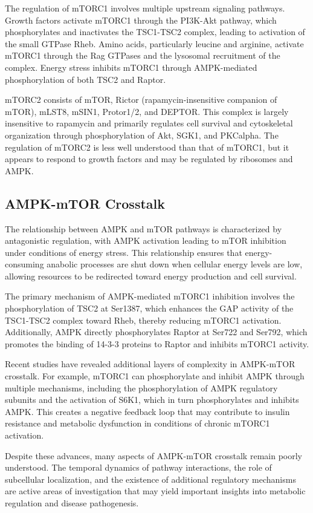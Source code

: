 \documentclass[11pt,a4paper]{article}
\begin{document}
The regulation of mTORC1 involves multiple upstream signaling pathways. Growth factors activate mTORC1 through the PI3K-Akt pathway, which phosphorylates and inactivates the TSC1-TSC2 complex, leading to activation of the small GTPase Rheb. Amino acids, particularly leucine and arginine, activate mTORC1 through the Rag GTPases and the lysosomal recruitment of the complex. Energy stress inhibits mTORC1 through AMPK-mediated phosphorylation of both TSC2 and Raptor.

mTORC2 consists of mTOR, Rictor (rapamycin-insensitive companion of mTOR), mLST8, mSIN1, Protor1/2, and DEPTOR. This complex is largely insensitive to rapamycin and primarily regulates cell survival and cytoskeletal organization through phosphorylation of Akt, SGK1, and PKCalpha. The regulation of mTORC2 is less well understood than that of mTORC1, but it appears to respond to growth factors and may be regulated by ribosomes and AMPK.

\subsection{AMPK-mTOR Crosstalk}

The relationship between AMPK and mTOR pathways is characterized by antagonistic regulation, with AMPK activation leading to mTOR inhibition under conditions of energy stress. This relationship ensures that energy-consuming anabolic processes are shut down when cellular energy levels are low, allowing resources to be redirected toward energy production and cell survival.

The primary mechanism of AMPK-mediated mTORC1 inhibition involves the phosphorylation of TSC2 at Ser1387, which enhances the GAP activity of the TSC1-TSC2 complex toward Rheb, thereby reducing mTORC1 activation. Additionally, AMPK directly phosphorylates Raptor at Ser722 and Ser792, which promotes the binding of 14-3-3 proteins to Raptor and inhibits mTORC1 activity.

Recent studies have revealed additional layers of complexity in AMPK-mTOR crosstalk. For example, mTORC1 can phosphorylate and inhibit AMPK through multiple mechanisms, including the phosphorylation of AMPK regulatory subunits and the activation of S6K1, which in turn phosphorylates and inhibits AMPK. This creates a negative feedback loop that may contribute to insulin resistance and metabolic dysfunction in conditions of chronic mTORC1 activation.

Despite these advances, many aspects of AMPK-mTOR crosstalk remain poorly understood. The temporal dynamics of pathway interactions, the role of subcellular localization, and the existence of additional regulatory mechanisms are active areas of investigation that may yield important insights into metabolic regulation and disease pathogenesis.
\end{document}
